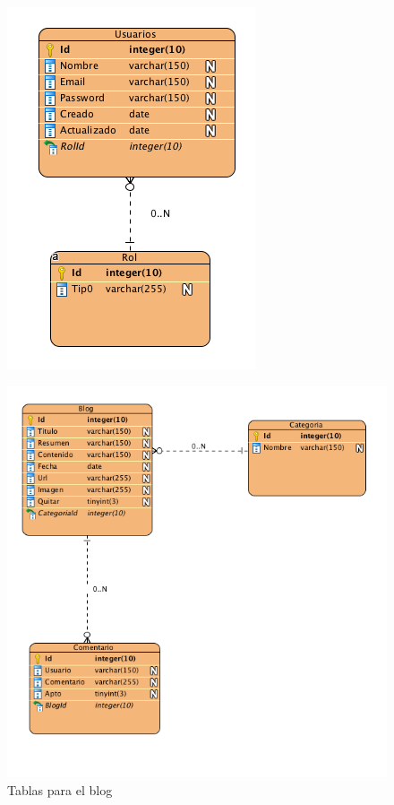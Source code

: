 \begin{figure}
\begin{center}
\includegraphics[scale=0.7]{imagenes/Usuarios.png}
\caption{}
\label{users_bd}
\end{center}
\end{figure}

\begin{figure}
\begin{center}
\includegraphics[scale=0.7]{imagenes/blog.png}
\caption{Tablas para el blog}
\label{blog_bd}
\end{center}
\end{figure}


